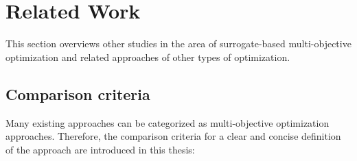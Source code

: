 \chapter{Related Work}\label{sec:related}

    This section overviews other studies in the area of surrogate-based multi-objective optimization and related approaches of other types of optimization.


    \section{Comparison criteria}
        Many existing approaches can be categorized as multi-objective optimization approaches. Therefore, the comparison criteria for a clear and concise definition of the approach are introduced in this thesis:
